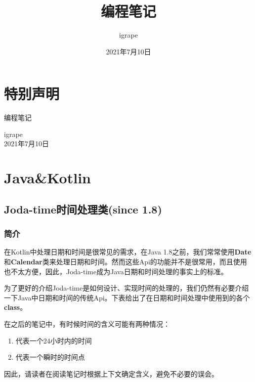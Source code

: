 \documentclass[cn,10pt,math=newtx,citestyle=gb7714-2015,bibstyle=gb7714-2015]{elegantbook}
\title{编程笔记}
\author{igrape}
\institute{TropicalTeamYard}
\date{2021年7月10日}
\begin{document}
    \maketitle

    \frontmatter

    \chapter*{特别声明}


    编程笔记

    \begin{flushright}
    igrape \\
    2021年7月10日
    \end{flushright}
    
    \tableofcontents

    \mainmatter

    \chapter{Java\&Kotlin}

    \section{Joda-time时间处理类(since 1.8)\label{section_1}}

    \begin{flushright}
    \end{flushright}

    \subsection{简介}

    在Kotlin中处理日期和时间是很常见的需求，在Java 1.8之前，我们常常使用\textbf{Date}和\textbf{Calendar}类来处理日期和时间。然而这些Api的功能并不是很常用，而且使用也不太方便，因此，Joda-time成为Java日期和时间处理的事实上的标准。

    为了更好的介绍Joda-time是如何设计、实现时间的处理的，我们仍然有必要介绍一下Java中日期和时间的传统Api。下表给出了在日期和时间处理中使用到的各个\textbf{class}。

    \begin{note}
        在之后的笔记中，有时候时间的含义可能有两种情况：
        \begin{enumerate}
            \item 代表一个24小时内的时间
            \item 代表一个瞬时的时间点
        \end{enumerate}
        因此，请读者在阅读笔记时根据上下文确定含义，避免不必要的误会。
    \end{note}
\end{document}
